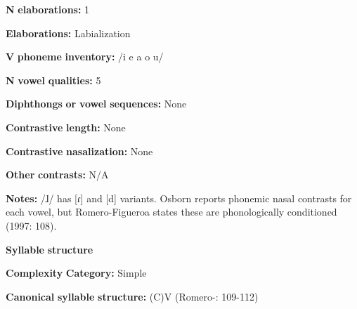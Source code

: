 \begin{styleBody}
\textbf{N} \textbf{elaborations:} 1
\end{styleBody}

\begin{styleBody}
\textbf{Elaborations:} Labialization
\end{styleBody}

\begin{styleBody}
\textbf{V} \textbf{phoneme} \textbf{inventory:} /i e a o u/
\end{styleBody}

\begin{styleBody}
\textbf{N} \textbf{vowel} \textbf{qualities:} 5
\end{styleBody}

\begin{styleBody}
\textbf{Diphthongs} \textbf{or} \textbf{vowel} \textbf{sequences:} None
\end{styleBody}

\begin{styleBody}
\textbf{Contrastive} \textbf{length:} None
\end{styleBody}

\begin{styleBody}
\textbf{Contrastive} \textbf{nasalization:} None
\end{styleBody}

\begin{styleBody}
\textbf{Other} \textbf{contrasts:} N/A
\end{styleBody}

\begin{styleBody}
\textbf{Notes:} /ɺ/ has [ɾ] and [d] variants. Osborn reports phonemic nasal contrasts for each vowel, but Romero-Figueroa states these are phonologically conditioned (1997: 108).
\end{styleBody}

\begin{styleBody}
\textbf{Syllable} \textbf{structure}
\end{styleBody}

\begin{styleBody}
\textbf{Complexity} \textbf{Category:} Simple
\end{styleBody}

\begin{styleBody}
\textbf{Canonical} \textbf{syllable} \textbf{structure:} (C)V (Romero-\citealt{Figeroa1997}: 109-112)
\end{styleBody}

